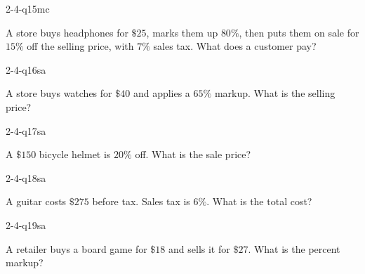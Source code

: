 \begin{practiceQuestion}{2-4-q15}{mc}
\begin{questionText}
A store buys headphones for $\$25$, marks them up $80\%$, then puts them on sale for $15\%$ off the selling price, with $7\%$ sales tax. What does a customer pay?
\end{questionText}
\end{practiceQuestion}


\begin{practiceQuestion}{2-4-q16}{sa}
\begin{questionText}
A store buys watches for $\$40$ and applies a $65\%$ markup. What is the selling price?
\end{questionText}
\end{practiceQuestion}

\begin{practiceQuestion}{2-4-q17}{sa}
\begin{questionText}
A $\$150$ bicycle helmet is $20\%$ off. What is the sale price?
\end{questionText}
\end{practiceQuestion}

\begin{practiceQuestion}{2-4-q18}{sa}
\begin{questionText}
A guitar costs $\$275$ before tax. Sales tax is $6\%$. What is the total cost?
\end{questionText}
\end{practiceQuestion}

\begin{practiceQuestion}{2-4-q19}{sa}
\begin{questionText}
A retailer buys a board game for $\$18$ and sells it for $\$27$. What is the percent markup?
\end{questionText}
\end{practiceQuestion}

